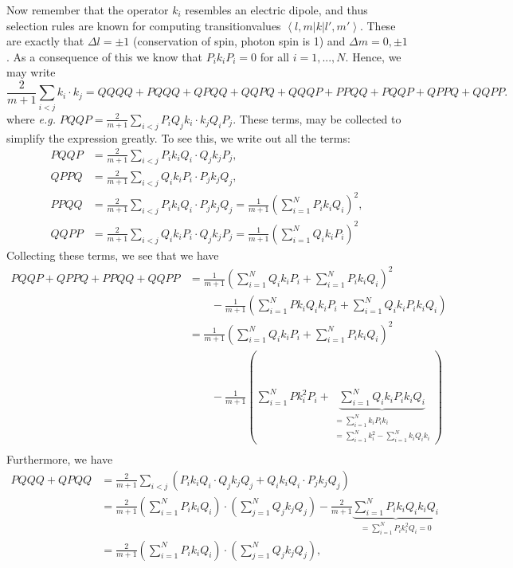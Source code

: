 \documentclass[a4paper,11pt]{article}
\renewcommand{\braket}[1]{\left\langle#1\right\rangle}
\newcommand{\eg}{\emph{e.g.} }
\numberwithin{equation}{section}
\begin{document}
	Now remember that the operator $ k_i $ resembles an electric dipole, and thus selection rules are known for computing transitionvalues $ \braket{l,m|k|l',m'} $. These are exactly that $ \Delta l=\pm1 $ (conservation of spin, photon spin is 1) and $ \Delta m= 0,\pm 1 $. As a consequence of this we know that $ P_ik_iP_i=0 $ for all $ i=1,...,N $. Hence, we may write \begin{equation}
	\frac{2}{m+1}\sum_{i<j} k_i\cdot k_j=QQQQ+PQQQ+QPQQ+QQPQ+QQQP+PPQQ+PQQP+QPPQ+QQPP.
	\end{equation} 
	where \eg $ PQQP=\frac{2}{m+1}\sum_{i<j}P_iQ_jk_i\cdot k_jQ_iP_j $. These terms, may be collected to simplify the expression greatly. To see this, we write out all the terms:
	\begin{equation}
	\begin{aligned}
	PQQP&=\frac{2}{m+1}\sum_{i<j} P_ik_iQ_i\cdot Q_jk_j P_j,\\
	QPPQ&=\frac{2}{m+1}\sum_{i<j} Q_ik_iP_i\cdot P_jk_j Q_j,\\
	PPQQ&=\frac{2}{m+1}\sum_{i<j} P_ik_iQ_i\cdot P_jk_j Q_j=\frac{1}{m+1}\left(\sum_{i=1}^{N}P_ik_iQ_i\right)^2,\\
	QQPP&=\frac{2}{m+1}\sum_{i<j} Q_ik_iP_i\cdot Q_jk_j P_j=\frac{1}{m+1}\left(\sum_{i=1}^{N}Q_ik_iP_i\right)^2
	\end{aligned}
	\end{equation}
	Collecting these terms, we see that we have \begin{equation}
	\begin{aligned}
	PQQP+QPPQ+PPQQ+QQPP&=\frac{1}{m+1}\left(\sum_{i=1}^{N}Q_ik_iP_i+\sum_{i=1}^{N}P_ik_iQ_i\right)^2\\& \qquad-\frac{1}{m+1}\left(\sum_{i=1}^{N}Pk_iQ_ik_iP_i+\sum_{i=1}^{N}Q_ik_iP_ik_iQ_i\right)\\
	&=\frac{1}{m+1}\left(\sum_{i=1}^{N}Q_ik_iP_i+\sum_{i=1}^{N}P_ik_iQ_i\right)^2\\& \qquad-\frac{1}{m+1}\left(\sum_{i=1}^{N}Pk_i^2P_i+\underbrace{\sum_{i=1}^{N}Q_ik_iP_ik_iQ_i}_{\substack{=\sum_{i=1}^{N}k_iP_ik_i\\=\sum_{i=1}^{N}k_i^2-\sum_{i=1}^{N}k_iQ_ik_i}}\right)\\
	\end{aligned}
	\end{equation}
	Furthermore, we have \begin{equation}
	\begin{aligned}
	PQQQ+QPQQ&=\frac{2}{m+1}\sum_{i<j}\left(P_ik_iQ_i\cdot Q_jk_jQ_j+Q_ik_iQ_i\cdot P_jk_jQ_j\right)\\&=\frac{2}{m+1}\left(\sum_{i=1}^{N}P_ik_iQ_i\right)\cdot\left(\sum_{j=1}^{N}Q_jk_jQ_j\right)-\frac{2}{m+1}\underbrace{\sum_{i=1}^{N}P_ik_iQ_ik_iQ_i}_{=\sum_{i=1}^{N}P_ik_i^2Q_i=0}\\
	&=\frac{2}{m+1}\left(\sum_{i=1}^{N}P_ik_iQ_i\right)\cdot\left(\sum_{j=1}^{N}Q_jk_jQ_j\right),
	\end{aligned}
	\end{equation}
\end{document}
